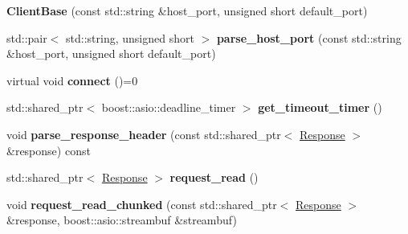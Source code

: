 \begin{DoxyCompactItemize}
\item 
\mbox{\label{classhttp_1_1_client_base_a2ff65d90b13a6023365c24c262d225db}} 
{\bfseries Client\+Base} (const std\+::string \&host\+\_\+port, unsigned short default\+\_\+port)
\item 
\mbox{\label{classhttp_1_1_client_base_ad7961a2aa770956abdba876ca71c7e44}} 
std\+::pair$<$ std\+::string, unsigned short $>$ {\bfseries parse\+\_\+host\+\_\+port} (const std\+::string \&host\+\_\+port, unsigned short default\+\_\+port)
\item 
\mbox{\label{classhttp_1_1_client_base_adeded9b02b837389f6cc9805237255d8}} 
virtual void {\bfseries connect} ()=0
\item 
\mbox{\label{classhttp_1_1_client_base_a35344900c1a5a847b5cad6e71683388e}} 
std\+::shared\+\_\+ptr$<$ boost\+::asio\+::deadline\+\_\+timer $>$ {\bfseries get\+\_\+timeout\+\_\+timer} ()
\item 
\mbox{\label{classhttp_1_1_client_base_a9a974d37fdd95968ee952f8bd923c4cf}} 
void {\bfseries parse\+\_\+response\+\_\+header} (const std\+::shared\+\_\+ptr$<$ \hyperlink{classhttp_1_1_client_base_1_1_response}{Response} $>$ \&response) const
\item 
\mbox{\label{classhttp_1_1_client_base_ac755547ec13040504a2d26af90c6042f}} 
std\+::shared\+\_\+ptr$<$ \hyperlink{classhttp_1_1_client_base_1_1_response}{Response} $>$ {\bfseries request\+\_\+read} ()
\item 
\mbox{\label{classhttp_1_1_client_base_a83b002bc7cd15da4d817d48e077d74ab}} 
void {\bfseries request\+\_\+read\+\_\+chunked} (const std\+::shared\+\_\+ptr$<$ \hyperlink{classhttp_1_1_client_base_1_1_response}{Response} $>$ \&response, boost\+::asio\+::streambuf \&streambuf)
\end{DoxyCompactItemize}
